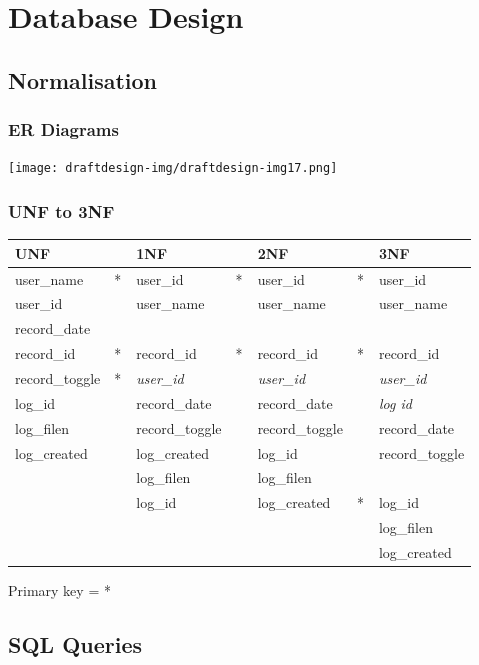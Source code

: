 \documentclass[12pt,a4paper]{report}
\begin{document}
\section[Database Design]{Database Design}
\subsection[Normalisation]{Normalisation}
\subsubsection[ER Diagrams]{ER Diagrams}
\texttt{[image: draftdesign-img/draftdesign-img17.png]}


\subsubsection[UNF to 3NF]{UNF to 3NF}


\begin{tabular}{|l|l|l|l|l|l|l|}
\hline
UNF &
~
 &
1NF &
~
 &
2NF &
~
 &
3NF\\\hline
user\_name &
* &
user\_id &
* &
user\_id &
* &
user\_id\\\hline
user\_id &
~
 &
user\_name &
~
 &
user\_name &
~
 &
user\_name\\\hline
record\_date &
~
 &
~
 &
~
 &
~
 &
~
 &
~
\\\hline
record\_id &
* &
record\_id &
* &
record\_id &
* &
record\_id\\\hline
record\_toggle &
* &
\textit{user\_id} &
~
 &
\textit{user\_id} &
~
 &
\textit{user\_id}\\\hline
log\_id &
~
 &
record\_date &
~
 &
record\_date &
~
 &
\textit{log id}\\\hline
log\_filen &
~
 &
record\_toggle &
~
 &
record\_toggle &
~
 &
record\_date\\\hline
log\_created &
~
 &
log\_created &
~
 &
log\_id &
~
 &
record\_toggle\\\hline
~
 &
~
 &
log\_filen &
~
 &
log\_filen &
~
 &
~
\\\hline
~
 &
~
 &
log\_id &
~
 &
log\_created &
* &
log\_id\\\hline
~
 &
~
 &
~
 &
~
 &
~
 &
~
 &
log\_filen\\\hline
~
 &
~
 &
~
 &
~
 &
~
 &
~
 &
log\_created\\\hline
\end{tabular}

Primary key = *

\subsection[SQL Queries]{SQL Queries}
\end{document}
